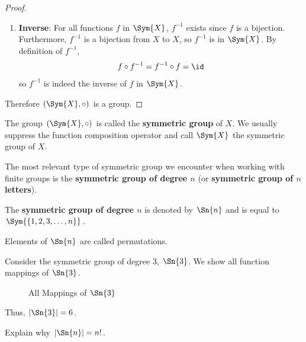 \begin{proof}
\begin{enumerate}
        \item \textbf{Inverse}: For all functions $f$ in $\Sym{X}$, $f^{-1}$ exists since $f$ is a bijection. Furthermore, $f^{-1}$ is a bijection from $X$ to $X$, so $f^{-1}$ is in $\Sym{X}$. By definition of $f^{-1}$,
        \[
            f \circ f^{-1} = f^{-1} \circ f = \id
        \]
        so $f^{-1}$ is indeed the inverse of $f$ in $\Sym{X}$.
    \end{enumerate}
    Therefore $(\Sym{X}, \circ)$ is a group.
\end{proof}

The group $(\Sym{X}, \circ)$ is called the \textbf{symmetric group} of $X$. We usually suppress the function composition operator and call $\Sym{X}$ the symmetric group of $X$.

The most relevant type of symmetric group we encounter when working with finite groups is the \textbf{symmetric group of degree $n$} (or \textbf{symmetric group of $n$ letters}).
\begin{definition}
    The \textbf{symmetric group of degree $n$} is denoted by $\Sn{n}$ and is equal to $\Sym{\{1, 2, 3, \dots, n\}}$.
\end{definition}
\begin{remark}
    Elements of $\Sn{n}$ are called permutations.
\end{remark}

\begin{example}\label{example-symmetric-group-of-degree-3}
    Consider the symmetric group of degree 3, $\Sn{3}$. We show all function mappings of $\Sn{3}$.

    \begin{figure}[h]
        \centering
        \caption{All Mappings of $\Sn{3}$}
    \end{figure}

    Thus, $|\Sn{3}| = 6$.
\end{example}
\begin{exercise}\label{exercise-order-of-Sn}
    Explain why $|\Sn{n}| = n!$.
\end{exercise}

